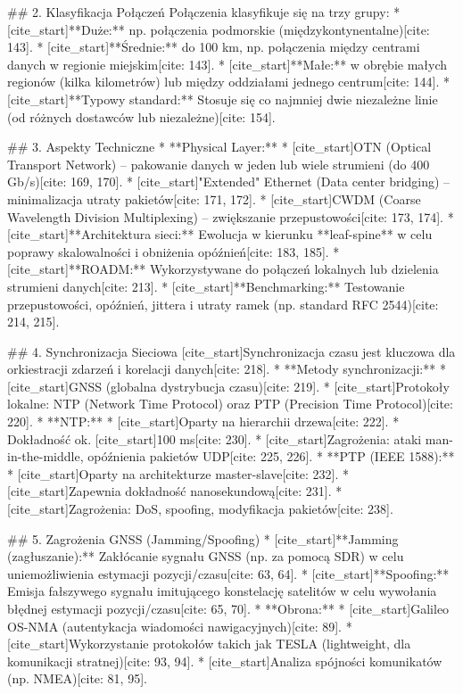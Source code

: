 ## 2. Klasyfikacja Połączeń
Połączenia klasyfikuje się na trzy grupy:
* [cite_start]**Duże:** np. połączenia podmorskie (międzykontynentalne)[cite: 143].
* [cite_start]**Średnie:** do 100 km, np. połączenia między centrami danych w regionie miejskim[cite: 143].
* [cite_start]**Małe:** w obrębie małych regionów (kilka kilometrów) lub między oddziałami jednego centrum[cite: 144].
* [cite_start]**Typowy standard:** Stosuje się co najmniej dwie niezależne linie (od różnych dostawców lub niezależne)[cite: 154].

## 3. Aspekty Techniczne
* **Physical Layer:**
    * [cite_start]OTN (Optical Transport Network) – pakowanie danych w jeden lub wiele strumieni (do 400 Gb/s)[cite: 169, 170].
    * [cite_start]"Extended" Ethernet (Data center bridging) – minimalizacja utraty pakietów[cite: 171, 172].
    * [cite_start]CWDM (Coarse Wavelength Division Multiplexing) – zwiększanie przepustowości[cite: 173, 174].
* [cite_start]**Architektura sieci:** Ewolucja w kierunku **leaf-spine** w celu poprawy skalowalności i obniżenia opóźnień[cite: 183, 185].
* [cite_start]**ROADM:** Wykorzystywane do połączeń lokalnych lub dzielenia strumieni danych[cite: 213].
* [cite_start]**Benchmarking:** Testowanie przepustowości, opóźnień, jittera i utraty ramek (np. standard RFC 2544)[cite: 214, 215].

## 4. Synchronizacja Sieciowa
[cite_start]Synchronizacja czasu jest kluczowa dla orkiestracji zdarzeń i korelacji danych[cite: 218].
* **Metody synchronizacji:**
    * [cite_start]GNSS (globalna dystrybucja czasu)[cite: 219].
    * [cite_start]Protokoły lokalne: NTP (Network Time Protocol) oraz PTP (Precision Time Protocol)[cite: 220].
* **NTP:**
    * [cite_start]Oparty na hierarchii drzewa[cite: 222].
    * Dokładność ok. [cite_start]100 ms[cite: 230].
    * [cite_start]Zagrożenia: ataki man-in-the-middle, opóźnienia pakietów UDP[cite: 225, 226].
* **PTP (IEEE 1588):**
    * [cite_start]Oparty na architekturze master-slave[cite: 232].
    * [cite_start]Zapewnia dokładność nanosekundową[cite: 231].
    * [cite_start]Zagrożenia: DoS, spoofing, modyfikacja pakietów[cite: 238].

## 5. Zagrożenia GNSS (Jamming/Spoofing)
* [cite_start]**Jamming (zagłuszanie):** Zakłócanie sygnału GNSS (np. za pomocą SDR) w celu uniemożliwienia estymacji pozycji/czasu[cite: 63, 64].
* [cite_start]**Spoofing:** Emisja fałszywego sygnału imitującego konstelację satelitów w celu wywołania błędnej estymacji pozycji/czasu[cite: 65, 70].
* **Obrona:**
    * [cite_start]Galileo OS-NMA (autentykacja wiadomości nawigacyjnych)[cite: 89].
    * [cite_start]Wykorzystanie protokołów takich jak TESLA (lightweight, dla komunikacji stratnej)[cite: 93, 94].
    * [cite_start]Analiza spójności komunikatów (np. NMEA)[cite: 81, 95].


